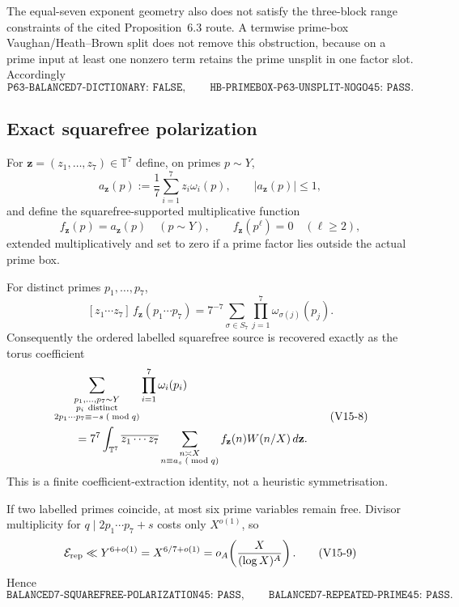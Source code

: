 The equal-seven exponent geometry also does not satisfy the three-block range constraints of
the cited Proposition~6.3 route.  A termwise prime-box Vaughan/Heath--Brown split does not
remove this obstruction, because on a prime input at least one nonzero term retains the prime
unsplit in one factor slot.  Accordingly
\[
 \texttt{P63-BALANCED7-DICTIONARY: FALSE},
 \qquad
 \texttt{HB-PRIMEBOX-P63-UNSPLIT-NOGO45: PASS}.
 \tag{V15-4}
\]

\subsection*{Exact squarefree polarization}

For $\mathbf z=(z_1,\ldots,z_7)\in\mathbb T^7$ define, on primes $p\sim Y$,
\[
 a_{\mathbf z}(p):=\frac17\sum_{i=1}^{7}z_i\omega_i(p),
 \qquad |a_{\mathbf z}(p)|\le1,
 \tag{V15-5}
\]
and define the squarefree-supported multiplicative function
\[
 f_{\mathbf z}(p)=a_{\mathbf z}(p)\quad(p\sim Y),\qquad
 f_{\mathbf z}(p^\ell)=0\quad(\ell\ge2),
 \tag{V15-6}
\]
extended multiplicatively and set to zero if a prime factor lies outside the actual prime box.

For distinct primes $p_1,\ldots,p_7$,
\[
 [z_1\cdots z_7]\,f_{\mathbf z}(p_1\cdots p_7)
 =
 7^{-7}
 \sum_{\sigma\in S_7}
 \prod_{j=1}^{7}\omega_{\sigma(j)}(p_j).
 \tag{V15-7}
\]
Consequently the ordered labelled squarefree source is recovered exactly as the torus
coefficient
\[
 \begin{aligned}
 &\sum_{\substack{p_1,\ldots,p_7\sim Y\\
                  p_i\ {\rm distinct}\\
                  2p_1\cdots p_7\equiv-s\;(\bmod q)}}
 \prod_{i=1}^{7}\omega_i(p_i)
 \\
 &\qquad =
 7^7
 \int_{\mathbb T^7}
 \overline{z_1\cdots z_7}
 \sum_{\substack{n\asymp X\\n\equiv a_s\;(\bmod q)}}
 f_{\mathbf z}(n)W(n/X)\,d\mathbf z .
 \end{aligned}
 \tag{V15-8}
\]
This is a finite coefficient-extraction identity, not a heuristic symmetrisation.

If two labelled primes coincide, at most six prime variables remain free.  Divisor
multiplicity for $q\mid 2p_1\cdots p_7+s$ costs only $X^{o(1)}$, so
\[
 \mathcal E_{\rm rep}\ll Y^{6+o(1)}=X^{6/7+o(1)}
 =o_A\!\left(\frac{X}{(\log X)^A}\right).
 \tag{V15-9}
\]
Hence
\[
 \texttt{BALANCED7-SQUAREFREE-POLARIZATION45: PASS},
 \qquad
 \texttt{BALANCED7-REPEATED-PRIME45: PASS}.
\]

